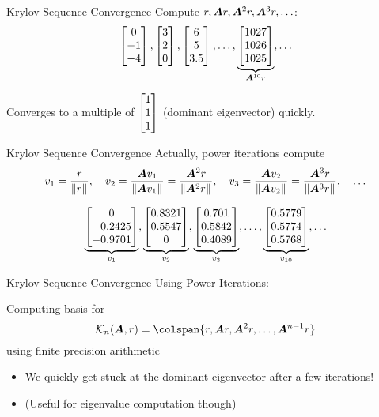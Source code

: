 \documentclass{beamer}
\begin{document}
\begin{frame}{Krylov Sequence Convergence}
Compute $r,\bm{A} r,\bm{A}^2 r, \bm{A}^3 r,\ldots$:
\[
\begin{bmatrix} 0\\-1\\-4\end{bmatrix}, \begin{bmatrix} 3\\2\\0\end{bmatrix},\begin{bmatrix} 6\\5\\3.5\end{bmatrix},\ldots,
\underbrace{\begin{bmatrix} 1027\\1026\\1025\end{bmatrix}}_{\bm{A}^{10}r}, \ldots
\]
 
Converges to a multiple of $\begin{bmatrix} 1\\1\\1\end{bmatrix}$ (dominant eigenvector) quickly.
\end{frame}



\begin{frame}{Krylov Sequence Convergence}
Actually, power iterations compute 
\[
 v_1 = \frac{r}{\left\| r \right\|_{}},\quad v_2 =\frac{\bm{A} v_1}{\left\| \bm{A} v_1 \right\|_{}}= \frac{\bm{A}^2 r}{\left\| \bm{A}^2 r \right\|_{}},
\quad v_3 = \frac{\bm{A} v_2}{\left\| \bm{A} v_2 \right\|_{}}=\frac{\bm{A}^3 r}{\left\| \bm{A}^3 r \right\|_{}},\quad\ldots
\]

\[
\underbrace{\begin{bmatrix} 0\\-0.2425\\-0.9701\end{bmatrix}}_{v_1},\underbrace{\begin{bmatrix}  0.8321\\0.5547\\0\end{bmatrix}}_{v_2},
\underbrace{\begin{bmatrix} 0.701\\0.5842\\0.4089\end{bmatrix}}_{v_3},\ldots,
\underbrace{\begin{bmatrix} 0.5779\\0.5774\\0.5768\end{bmatrix}}_{v_{10}}, \ldots
\]

\end{frame}





\begin{frame}{Krylov Sequence Convergence}
\large{Using Power Iterations:}
\bigskip 

Computing basis for 
\[
\krylov{n}{\A}{r} = \colspan\{r, \A r, \A^2 r, \ldots, \A^{n-1} r \}
\]
\bigskip
using finite precision arithmetic 

\begin{itemize}
\item We quickly get stuck at the dominant eigenvector after a few iterations!

\bigskip
\item (Useful for eigenvalue computation though)
\end{itemize}

\end{frame}
\end{document}
